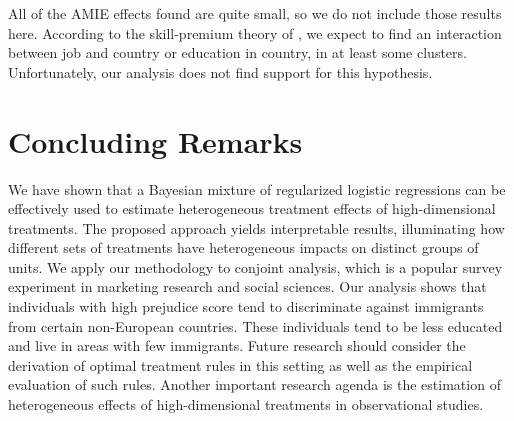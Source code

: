 \documentclass[11pt]{article}
\newcommand\spacingset[1]{\renewcommand{\baselinestretch}%
  {#1}\small\normalsize}
\begin{document}
All of the AMIE effects found are quite small, so we do not include
those results here.  According to the skill-premium theory of
\cite{newman2019economic}, we expect to find an interaction between
job and country or education in country, in at least some clusters.
Unfortunately, our analysis does not find support for this hypothesis.


%

\section{Concluding Remarks}\label{sec:disc}

We have shown that a Bayesian mixture of regularized logistic
regressions can be effectively used to estimate heterogeneous
treatment effects of high-dimensional treatments.  The proposed
approach yields interpretable results, illuminating how different sets
of treatments have heterogeneous impacts on distinct groups of units.
We apply our methodology to conjoint analysis, which is a popular
survey experiment in marketing research and social sciences.  Our
analysis shows that individuals with high prejudice score tend to
discriminate against immigrants from certain non-European countries.
These individuals tend to be less educated and live in areas with few
immigrants.  Future research should consider the derivation of optimal
treatment rules in this setting as well as the empirical evaluation of
such rules.  Another important research agenda is the estimation of
heterogeneous effects of high-dimensional treatments in observational
studies.
\end{document}
